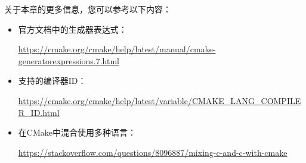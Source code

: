 关于本章的更多信息，您可以参考以下内容：

\begin{itemize}
\item
官方文档中的生成器表达式：

\url{https://cmake.org/cmake/help/latest/manual/cmake-generatorexpressions.7.html}

\item
支持的编译器ID：

\url{https://cmake.org/cmake/help/latest/variable/CMAKE_LANG_COMPILER_ID.html}

\item
在CMake中混合使用多种语言：

\url{https://stackoverflow.com/questions/8096887/mixing-c-and-c-with-cmake}
\end{itemize}